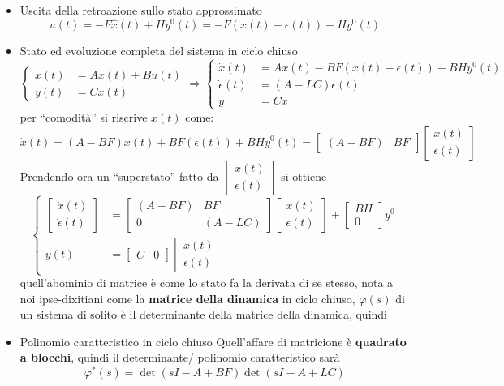 \documentclass{article}
\begin{document}
\begin{itemize}
\item Uscita della retroazione sullo stato approssimato
  \[ u(t) = -F\hat{x}(t) + Hy^0 (t) = -F(x(t) - \epsilon (t)) + Hy^0 (t)\]
\item Stato ed evoluzione completa del sistema in ciclo chiuso
  \[\begin{cases}
  \dot{x}(t) &= Ax(t) + Bu(t) \\
  y(t) &= Cx(t)
  \end{cases} \Rightarrow
  \begin{cases}
    \dot{x}(t) &= Ax(t) - BF(x(t) - \epsilon (t)) + BH y^0 (t) \\
    \dot{\epsilon}(t) &= (A-LC) \epsilon (t) \\
    y &= Cx
  \end{cases}\]
  per ``comodità'' si riscrive $\dot{x}(t)$ come:
  \[\dot{x}(t) = (A-BF)x(t) + BF(\epsilon (t)) + BH y^0 (t) =
  \begin{bmatrix} (A-BF) & BF \end{bmatrix}
  \begin{bmatrix} x(t) \\ \epsilon(t) \end{bmatrix}\]
  Prendendo ora un ``superstato'' fatto da
  $\begin{bmatrix} x(t) \\ \epsilon(t) \end{bmatrix}$
  si ottiene
  \[\begin{cases}
  \begin{bmatrix} \dot{x}(t) \\ \dot{\epsilon}(t) \end{bmatrix} &=
  \begin{bmatrix} (A-BF) & BF \\ 0 & (A-LC) \end{bmatrix}
  \begin{bmatrix} x(t) \\ \epsilon(t) \end{bmatrix} +
  \begin{bmatrix} BH \\ 0 \end{bmatrix} y^0\\
  y(t) &= \begin{bmatrix}C & 0\end{bmatrix}
    \begin{bmatrix} x(t) \\ \epsilon(t) \end{bmatrix}
  \end{cases}\]
  quell'abominio di matrice è come lo stato fa la derivata di se stesso, nota a
  noi ipse-dixitiani come la \textbf{matrice della dinamica} in ciclo chiuso,
  $\varphi (s)$ di un sistema di solito è il determinante della matrice della
  dinamica, quindi
\item Polinomio caratteristico in ciclo chiuso
  Quell'affare di matricione è \textbf{quadrato a blocchi}, quindi il
  determinante/ polinomio caratteristico sarà
  \[ \varphi ^{\ast} (s) = \det(sI - A + BF) \det(sI - A + LC) \]
\end{itemize}
\end{document}
